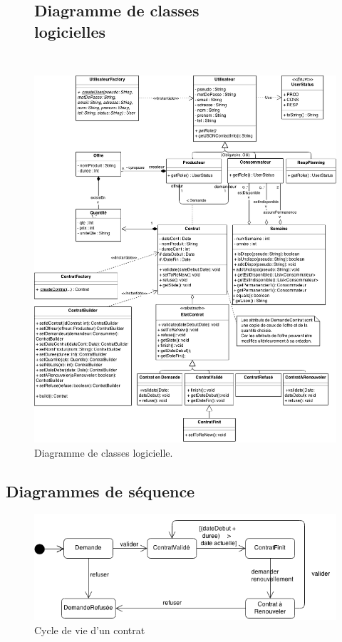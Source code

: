 \documentclass[12pt]{report}
\begin{document}
\begin{figure}[!hp]
\centering
\subsection{Diagramme de classes logicielles~~~~~~~~~~~~~~~~~~~~~~~~~~~~~~~}
\includegraphics[height=1.\textwidth]{./ressources/class_logicielle.png}
\caption{Diagramme de classes logicielle.}
\end{figure}
\clearpage

\subsection{Diagrammes de séquence}
\begin{figure}[!hp]
\centering
\includegraphics[width=1.\textwidth]{./ressources/etat_transition_contrat.png}
\caption{Cycle de vie d'un contrat}
\end{figure}
\clearpage
\end{document}
